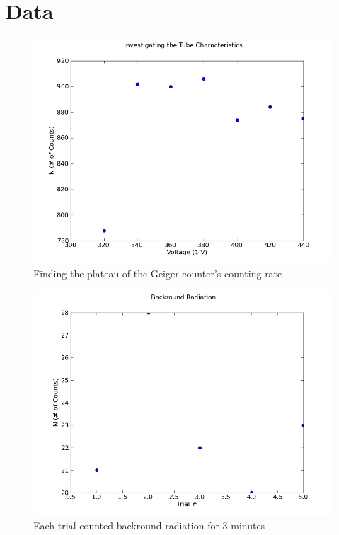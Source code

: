 \documentclass[12pt]{article}
\begin{document}
\section{Data}
\begin{figure}[H]
\centering
\hspace{-0.0in}\includegraphics[scale=0.60]{Plot1.png}
\caption{Finding the plateau of the Geiger counter's counting rate \label{fig:setup}}
\end{figure}

\begin{figure}[H]
\centering
\hspace{-0.0in}\includegraphics[scale=0.60]{Plot2.png}
\caption{Each trial counted backround radiation for 3 minutes \label{fig:setup}}
\end{figure}
\end{document}
